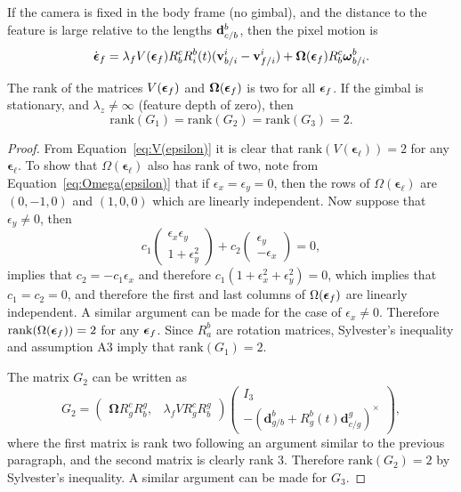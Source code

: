 \begin{corollary} \label{cor:visual_servoing_no_gimbal}
	If the camera is fixed in the body frame (no gimbal), and the distance to the feature is large relative to the lengths $\mathbf{d}_{c/b}^b$, then the pixel motion is
	\[
	\dot{\boldsymbol{\epsilon}}_f = \lambda_f V(\boldsymbol{\epsilon}_f)R_b^c R_i^b(t)(\mathbf{v}_{b/i}^i - \mathbf{v}_{f/i}^i) + \boldsymbol{\Omega}(\boldsymbol{\epsilon}_f) R_b^c \boldsymbol{\omega}_{b/i}^b.
	\]
\end{corollary}

\begin{lemma}
	The rank of the matrices $V(\boldsymbol{\epsilon}_f)$ and $\boldsymbol{\Omega}(\boldsymbol{\epsilon}_f)$ is two for all $\boldsymbol{\epsilon}_f$.  If the gimbal is stationary, and $\lambda_z\neq\infty$ (feature depth of zero), then 
	\[
	\text{rank}(G_1) = \text{rank}(G_2) = \text{rank}(G_3) = 2.
	\]	
\end{lemma}
\begin{proof}
	From Equation~\eqref{eq:V(epsilon)} it is clear that $\text{rank}(V(\boldsymbol{\epsilon}_\ell))=2$ for any $\boldsymbol{\epsilon}_\ell$.  To show that $\Omega(\boldsymbol{\epsilon}_\ell)$ also has rank of two, note from Equation~\eqref{eq:Omega(epsilon)} that if $\epsilon_x=\epsilon_y=0$, then the rows of $\Omega(\boldsymbol{\epsilon}_\ell)$ are $(0, -1, 0)$ and $(1, 0, 0)$ which are linearly independent.  Now suppose that $\epsilon_y\neq 0$, then
	\[
	c_1\begin{pmatrix} \epsilon_x\epsilon_y \\ 1 + \epsilon_y^2 \end{pmatrix} + c_2 \begin{pmatrix} \epsilon_y \\ -\epsilon_x \end{pmatrix} = 0,
	\]
	implies that $c_2 = -c_1\epsilon_x$ and therefore $c_1(1 + \epsilon_x^2 + \epsilon_y^2)=0$, which implies that $c_1=c_2=0$, and therefore the first and last columns of $\Omega(\boldsymbol{\epsilon}_f)$ are linearly independent.  A similar argument can be made for the case of $\epsilon_x\neq 0$.  Therefore $\text{rank}(\Omega(\boldsymbol{\epsilon}_f))=2$ for any $\boldsymbol{\epsilon}_f$.
	Since $R_a^b$ are rotation matrices, Sylvester's inequality and assumption A3 imply that $\text{rank}(G_1)=2$.  

	The matrix $G_2$ can be written as
	\[
	G_2 = \begin{pmatrix} \boldsymbol{\Omega}R_g^cR_b^g, & \lambda_f V R_g^cR_b^g \end{pmatrix} \begin{pmatrix} I_3 \\ -(\mathbf{d}_{g/b}^b+R_g^b(t) \mathbf{d}_{c/g}^g)^\times \end{pmatrix},
	\]
	where the first matrix is rank two following an argument similar to the previous paragraph, and the second matrix is clearly rank 3.  Therefore $\text{rank}(G_2)=2$ by Sylvester's inequality.
 	A similar argument can be made for $G_3$.
\end{proof}


